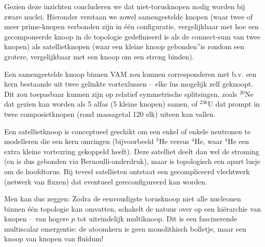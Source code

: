 Gezien deze inzichten concluderen we dat niet-torusknopen nodig worden bij zware nuclei. Hieronder verstaan we zowel samengestelde knopen (waar twee of meer prime-knopen verbonden zijn in één configuratie, vergelijkbaar met hoe een gecomponeerde knoop in de topologie gedefinieerd is als de connect-sum van twee knopen) als satellietknopen (waar een kleine knoop \grqq gebonden\textquotedblright is rondom een grotere, vergelijkbaar met een knoop om een streng binden).

Een samengestelde knoop binnen VAM zou kunnen corresponderen met b.v. een kern bestaande uit twee gelinkte vortexlussen – elke lus mogelijk zelf geknoopt. Dit zou toepasbaar kunnen zijn op relatief symmetrische splitsingen, zoals $^{20}$Ne dat gezien kan worden als 5 alfa\rqs s (5 kleine knopen) samen, of $^{236}$U dat prompt in twee composietknopen (rond massagetal 120 elk) uiteen kan vallen.

Een satellietknoop is conceptueel geschikt om een enkel of enkele neutronen te modelleren die een kern omringen (bijvoorbeeld $^3$He versus $^4$He, waar $^4$He een extra kleine vortexring gekoppeld heeft). Deze satelliet deelt dan wel de stroming (en is dus gebonden via Bernoulli-onderdruk), maar is topologisch een apart lusje om de hoofdtorus. Bij teveel satellieten ontstaat een gecompliceerd vlechtwerk (netwerk van fluxen) dat eventueel gereconfigureerd kan worden.

Men kan dus zeggen: Zodra de eenvoudigste torusknoop niet alle nucleonen binnen één topologie kan omvatten, schakelt de natuur over op een hiërarchie van knopen – van hogere $p$ tot uiteindelijk multiknoop. Dit is een fascinerende multiscalar emergentie: de atoomkern is geen monolithisch bolletje, maar een knoop van knopen van fluïdum!